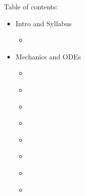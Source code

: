 \documentclass[letterpaper,10pt,english]{jupyterBook}
\begin{document}
\sphinxAtStartPar
Table of contents:
\begin{itemize}
\item {} 
 \sphinxhyphen{} Intro and Syllabus

\begin{itemize}
\item {} 
\sphinxAtStartPar
{\hyperref[\detokenize{content/0_course/syllabus::doc}]{}}

\end{itemize}
\end{itemize}
\begin{itemize}
\item {} 
 \sphinxhyphen{} Mechanics and ODEs

\begin{itemize}
\item {} 
\sphinxAtStartPar
{\hyperref[\detokenize{content/1_mechanics/mechanics_intro::doc}]{}}

\item {} 
\sphinxAtStartPar
{\hyperref[\detokenize{content/1_mechanics/frames::doc}]{}}

\item {} 
\sphinxAtStartPar
{\hyperref[\detokenize{content/1_mechanics/lagrange_1::doc}]{}}

\item {} 
\sphinxAtStartPar
{\hyperref[\detokenize{content/1_mechanics/lagrange_2::doc}]{}}

\item {} 
\sphinxAtStartPar
{\hyperref[\detokenize{content/1_mechanics/dynamical_1::doc}]{}}

\item {} 
\sphinxAtStartPar
{\hyperref[\detokenize{content/1_mechanics/dynamical_2::doc}]{}}

\item {} 
\sphinxAtStartPar
{\hyperref[\detokenize{content/1_mechanics/CHAOS::doc}]{}}

\item {} 
\sphinxAtStartPar
{\hyperref[\detokenize{content/1_mechanics/ODE_games::doc}]{}}

\end{itemize}
\end{itemize}
\end{document}
